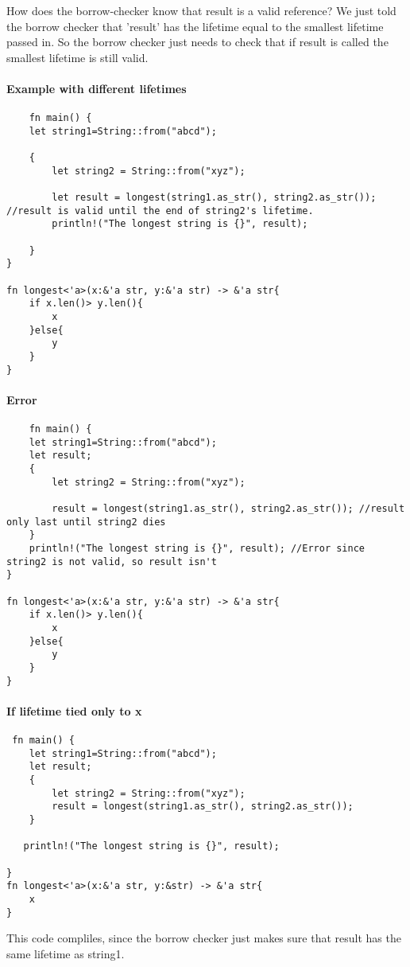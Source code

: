 How does the borrow-checker know that result is a valid reference? We just told the borrow checker that 'result' has the lifetime equal to the smallest lifetime passed in. 
So the borrow checker just needs to check that if result is called the smallest lifetime is still valid.

\paragraph*{Example with different lifetimes}\begin{lstlisting}
    fn main() {
    let string1=String::from("abcd");
    
    {
        let string2 = String::from("xyz");

        let result = longest(string1.as_str(), string2.as_str()); //result is valid until the end of string2's lifetime. 
        println!("The longest string is {}", result); 

    } 
}    
   
fn longest<'a>(x:&'a str, y:&'a str) -> &'a str{  
    if x.len()> y.len(){
        x
    }else{
        y
    }
}
\end{lstlisting}

\paragraph*{Error}\begin{lstlisting}
    fn main() {
    let string1=String::from("abcd");
    let result;
    {
        let string2 = String::from("xyz");

        result = longest(string1.as_str(), string2.as_str()); //result only last until string2 dies 
    } 
    println!("The longest string is {}", result); //Error since string2 is not valid, so result isn't
}    
   
fn longest<'a>(x:&'a str, y:&'a str) -> &'a str{  
    if x.len()> y.len(){
        x
    }else{
        y
    }
}
\end{lstlisting}

\paragraph*{If lifetime tied only to x}\begin{lstlisting}
 fn main() {
    let string1=String::from("abcd");
    let result;    
    {
        let string2 = String::from("xyz");
        result = longest(string1.as_str(), string2.as_str());
    } 
   
   println!("The longest string is {}", result); 
    
}   
fn longest<'a>(x:&'a str, y:&str) -> &'a str{  
    x
}
\end{lstlisting}
This code compliles, since the borrow checker just makes sure that result has the same lifetime as string1.

